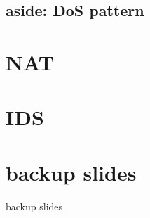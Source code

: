 \subsection{aside: DoS pattern}


\section{NAT}


\section{IDS}





\section{backup slides}
\begin{frame}{backup slides}
\end{frame}


